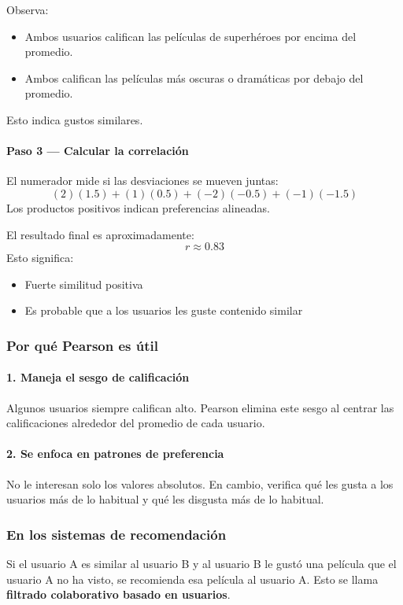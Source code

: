 \documentclass[12pt]{article}
\begin{document}
Observa:
\begin{itemize}
\item Ambos usuarios califican las películas de superhéroes por encima del promedio.
\item Ambos califican las películas más oscuras o dramáticas por debajo del promedio.
\end{itemize}
Esto indica gustos similares.

\paragraph{Paso 3 --- Calcular la correlación}
El numerador mide si las desviaciones se mueven juntas:
\[
(2)(1.5)+(1)(0.5)+(-2)(-0.5)+(-1)(-1.5)
\]
Los productos positivos indican preferencias alineadas.

El resultado final es aproximadamente:
\[
r\approx0.83
\]
Esto significa:
\begin{itemize}
\item Fuerte similitud positiva
\item Es probable que a los usuarios les guste contenido similar
\end{itemize}

\subsubsection*{Por qué Pearson es útil}
\paragraph{1. Maneja el sesgo de calificación} Algunos usuarios siempre califican alto. Pearson elimina este sesgo al centrar las calificaciones alrededor del promedio de cada usuario.

\paragraph{2. Se enfoca en patrones de preferencia} No le interesan solo los valores absolutos. En cambio, verifica qué les gusta a los usuarios más de lo habitual y qué les disgusta más de lo habitual.

\subsubsection*{En los sistemas de recomendación}
Si el usuario A es similar al usuario B y al usuario B le gustó una película que el usuario A no ha visto, se recomienda esa película al usuario A. Esto se llama \textbf{filtrado colaborativo basado en usuarios}.
\end{document}
